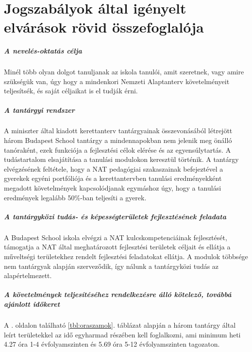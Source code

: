 \chapter{Jogszabályok által igényelt elvárások rövid összefoglalója}
\paragraph{A nevelés-oktatás célja}

Minél több olyan dolgot tanuljanak az iskola tanulói, amit szeretnek, vagy
amire szükségük van, úgy hogy a mindenkori Nemzeti Alaptanterv követelményeit
teljesítsék, és saját céljaikat is el tudják érni.

\paragraph{A tantárgyi rendszer}

A miniszter által kiadott kerettanterv tantárgyainak összevonásából létrejött
három Budapest School tantárgy a mindennapokban nem jelenik meg önálló
tanóraként, ezek funkciója a fejlesztési célok elérése és az egyensúlytartás. A
tudástartalom elsajátítása a tanulási modulokon keresztül történik. A tantárgy
elvégzésének feltétele, hogy a NAT pedagógiai szakaszainak befejeztével a
gyerekek egyéni portfóliója és a kerettantervben tanulási eredményekként
megadott követelmények kapcsolódjanak
egymáshoz úgy, hogy a tanulási eredmények legalább 50\%-ban teljesíti a gyerek.

\paragraph{A tantárgyközi tudás- és képességterületek fejlesztésének feladata}

A Budapest School iskola elvégzi a NAT kulcskompetenciáinak
fejlesztését, támogatja a NAT által meghatározott fejlesztési területek céljait
és ellátja a műveltségi területekhez rendelt fejlesztési feladatokat ellátja.
A modulok többsége nem tantárgyak alapján szerveződik, így nálunk a
tantárgyközi tudás az alapértelmezett.

\paragraph{A követelmények teljesítéséhez rendelkezésre álló kötelező, továbbá
    ajánlott időkeret}

A \pageref{tbl:oraszamok}. oldalon található \ref{tbl:oraszamok}. táblázat
alapján a három tantárgy által leírt területekkel az idő egyharmad részében
kell foglalkozni, ami minimum heti 4.27 óra 1-4 évfolyamszinten és 5.69 óra
5-12 évfolyamszinten
tagozaton.

